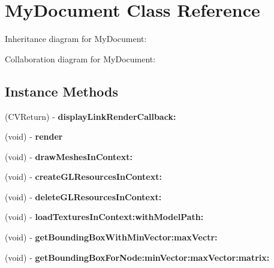 \hypertarget{interface_my_document}{\section{My\+Document Class Reference}
\label{interface_my_document}
}


Inheritance diagram for My\+Document\+:


Collaboration diagram for My\+Document\+:
\subsection*{Instance Methods}
\begin{DoxyCompactItemize}
\item 
\hypertarget{interface_my_document_a59179438cfbbf3ff875f50176b9e3688}{(C\+V\+Return) -\/ {\bfseries display\+Link\+Render\+Callback\+:}}\label{interface_my_document_a59179438cfbbf3ff875f50176b9e3688}

\item 
\hypertarget{interface_my_document_ac07b34a6be058da11677a02a3b1cd5b0}{(void) -\/ {\bfseries render}}\label{interface_my_document_ac07b34a6be058da11677a02a3b1cd5b0}

\item 
\hypertarget{interface_my_document_acf2f7aea43413a6357569e5c755d0643}{(void) -\/ {\bfseries draw\+Meshes\+In\+Context\+:}}\label{interface_my_document_acf2f7aea43413a6357569e5c755d0643}

\item 
\hypertarget{interface_my_document_a4ae291b79a8888583384681a01178816}{(void) -\/ {\bfseries create\+G\+L\+Resources\+In\+Context\+:}}\label{interface_my_document_a4ae291b79a8888583384681a01178816}

\item 
\hypertarget{interface_my_document_ae9ef1609157cee108e7185533f2ad281}{(void) -\/ {\bfseries delete\+G\+L\+Resources\+In\+Context\+:}}\label{interface_my_document_ae9ef1609157cee108e7185533f2ad281}

\item 
\hypertarget{interface_my_document_a89aabd55a3f2b297defbda9b4e2b0d37}{(void) -\/ {\bfseries load\+Textures\+In\+Context\+:with\+Model\+Path\+:}}\label{interface_my_document_a89aabd55a3f2b297defbda9b4e2b0d37}

\item 
\hypertarget{interface_my_document_a357c35e6fd2a2d5e759725e7f5c0c221}{(void) -\/ {\bfseries get\+Bounding\+Box\+With\+Min\+Vector\+:max\+Vectr\+:}}\label{interface_my_document_a357c35e6fd2a2d5e759725e7f5c0c221}

\item 
\hypertarget{interface_my_document_a01635f1c137ecb32eb6d3472beb8c396}{(void) -\/ {\bfseries get\+Bounding\+Box\+For\+Node\+:min\+Vector\+:max\+Vector\+:matrix\+:}}\label{interface_my_document_a01635f1c137ecb32eb6d3472beb8c396}

\end{DoxyCompactItemize}
